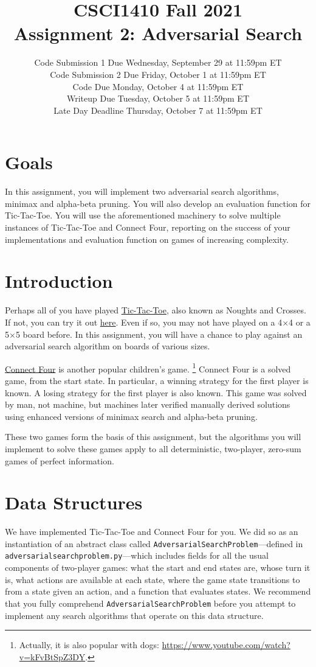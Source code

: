 \documentclass{article}
\title{CSCI1410 Fall 2021 \\
Assignment 2: Adversarial Search}
\date{%
Code Submission 1 Due Wednesday, September 29 at 11:59pm ET\\ [1ex]
Code Submission 2 Due Friday, October 1 at 11:59pm ET\\ [1ex]
Code Due Monday, October 4 at 11:59pm ET\\ [1ex]
Writeup Due Tuesday, October 5 at 11:59pm ET\\ [1ex]
Late Day Deadline Thursday, October 7 at 11:59pm ET
}
\begin{document}
\maketitle


\section{Goals}
In this assignment, you will implement two adversarial search algorithms,
minimax and alpha-beta pruning.
You will also develop an evaluation function for Tic-Tac-Toe.
You will use the aforementioned machinery to solve multiple instances of Tic-Tac-Toe and Connect Four,
reporting on the success of your implementations and evaluation function on games of increasing complexity.


\section{Introduction}
Perhaps all of you have played \href{https://en.wikipedia.org/wiki/Tic-tac-toe}{Tic-Tac-Toe},
also known as Noughts and Crosses.
If not, you can try it out \href{https://playtictactoe.org/}{here}.
Even if so, you may not have played on a 4$\times$4 or a 5$\times$5 board before.
In this assignment, you will have a chance to play against an adversarial search algorithm on boards of various sizes.

\href{https://en.wikipedia.org/wiki/Connect_Four}{Connect Four} is another popular children's game.%
\footnote{Actually, it is also popular with dogs: \url{https://www.youtube.com/watch?v=kFvBtSpZ3DY}.}
Connect Four is a solved game, from the start state.
In particular, a winning strategy for the first player is known.
A losing strategy for the first player is also known.
This game was solved by man, not machine,
but machines later verified manually derived solutions
using enhanced versions of minimax search and alpha-beta pruning.

These two games form the basis of this assignment,
but the algorithms you will implement to solve these games apply to all
deterministic, two-player, zero-sum games of perfect information.


\section{Data Structures}
We have implemented Tic-Tac-Toe and Connect Four for you.
We did so as an instantiation of an abstract class called
\verb|AdversarialSearchProblem|---defined in \verb|adversarialsearchproblem.py|---which
includes fields for all the usual components of two-player games:
what the start and end states are,
whose turn it is,
what actions are available at each state,
where the game state transitions to from a state given an action,
and a function that evaluates states. 
We recommend that you fully comprehend
\verb|AdversarialSearchProblem| before you attempt to
implement any search algorithms that operate on this data structure.
\end{document}
